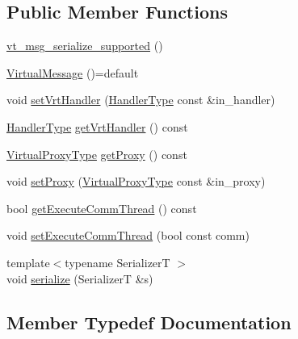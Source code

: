 \subsection*{Public Member Functions}
\begin{DoxyCompactItemize}
\item 
\hyperlink{structvt_1_1vrt_1_1_virtual_message_a4d91471760fc7b86e84a91f54596b1bd}{vt\+\_\+msg\+\_\+serialize\+\_\+supported} ()
\item 
\hyperlink{structvt_1_1vrt_1_1_virtual_message_a28ae0fd29c23d4e9552e659ff7f66cd5}{Virtual\+Message} ()=default
\item 
void \hyperlink{structvt_1_1vrt_1_1_virtual_message_aea0a3a35d2517ef094c9467b0c4ff066}{set\+Vrt\+Handler} (\hyperlink{namespacevt_af64846b57dfcaf104da3ef6967917573}{Handler\+Type} const \&in\+\_\+handler)
\item 
\hyperlink{namespacevt_af64846b57dfcaf104da3ef6967917573}{Handler\+Type} \hyperlink{structvt_1_1vrt_1_1_virtual_message_aaa41fe4b317b868fdcceb7c119feec9c}{get\+Vrt\+Handler} () const
\item 
\hyperlink{namespacevt_a1b417dd5d684f045bb58a0ede70045ac}{Virtual\+Proxy\+Type} \hyperlink{structvt_1_1vrt_1_1_virtual_message_a37cbc50547e033f049af3c9d289036cc}{get\+Proxy} () const
\item 
void \hyperlink{structvt_1_1vrt_1_1_virtual_message_aa4b2b70c7d560be3adff74102803ff51}{set\+Proxy} (\hyperlink{namespacevt_a1b417dd5d684f045bb58a0ede70045ac}{Virtual\+Proxy\+Type} const \&in\+\_\+proxy)
\item 
bool \hyperlink{structvt_1_1vrt_1_1_virtual_message_a9511339ccb737b655708c9071965dc76}{get\+Execute\+Comm\+Thread} () const
\item 
void \hyperlink{structvt_1_1vrt_1_1_virtual_message_a8149137c049179f315d295b5127b61ad}{set\+Execute\+Comm\+Thread} (bool const comm)
\item 
{\footnotesize template$<$typename SerializerT $>$ }\\void \hyperlink{structvt_1_1vrt_1_1_virtual_message_a08c925ee68dfb197b5e1dc9ca961b0d7}{serialize} (SerializerT \&s)
\end{DoxyCompactItemize}


\subsection{Member Typedef Documentation}
\mbox{\label{structvt_1_1vrt_1_1_virtual_message_acb60e6224a32e6d0a6fce939f511737a}} 
